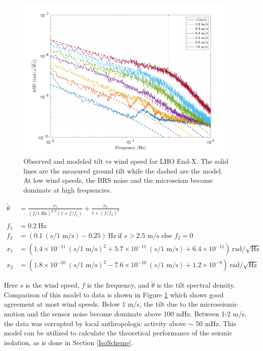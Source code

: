 \documentclass [12pt, proquest]{uwthesis}[2019]
\begin{document}
\begin{figure}[!h]
\begin{center}
\includegraphics[width=\textwidth]{TiltModel.pdf}
\caption[Observed and modeled tilt vs wind speed]{Observed and modeled tilt vs wind speed for LHO End-X. The solid lines are the measured ground tilt while the dashed are the model. At low wind speeds, the BRS noise and the microseism become dominate at high frequencies.}
\label{tiltModel}
\end{center}
\end{figure}

\begin{align}
\tilde{\theta}&=\frac{x_1}{(f/1\text{ Hz})^{2/3}(1+f/f_1)} +\frac{x_2}{1+(f/f_2)^3}\label{TiltModelEq}\\
\nonumber \\ 
f_1&=0.2\ \text{Hz}\nonumber \\
f_2&=(0.1\ (s/\text{1 m/s}) -0.25)\ \text{Hz}\ \text{if }s>2.5\text{ m/s}\text{ else }f_2=0\nonumber \\
x_1&=(1.4\times10^{-11}\ (s/\text{1 m/s})^2+5.7\times10^{-11}\ (s/\text{1 m/s})+6.4\times10^{-11})\ \text{rad}/\sqrt{\text{Hz}}\nonumber \\
x_2&=(1.8\times10^{-10}\ (s/\text{1 m/s})^2-7.6\times10^{-10}\ (s/\text{1 m/s})+1.2\times10^{-9})\ \text{rad}/\sqrt{\text{Hz}}\nonumber
\end{align}

Here $s$ is the wind speed, $f$ is the frequency, and $\tilde{\theta}$ is the tilt spectral density. Comparison of this model to data is shown in Figure \ref{tiltModel} which shows good agreement at most wind speeds. Below 1 m/s, the tilt due to the microseismic motion and the sensor noise become dominate above 100 mHz. Between 1-2 m/s, the data was corrupted by local anthropologic activity above $\sim$ 50 mHz. This model can be utilized to calculate the theoretical performance of the seismic isolation, as is done in Section \ref{IsoScheme}.
\end{document}

